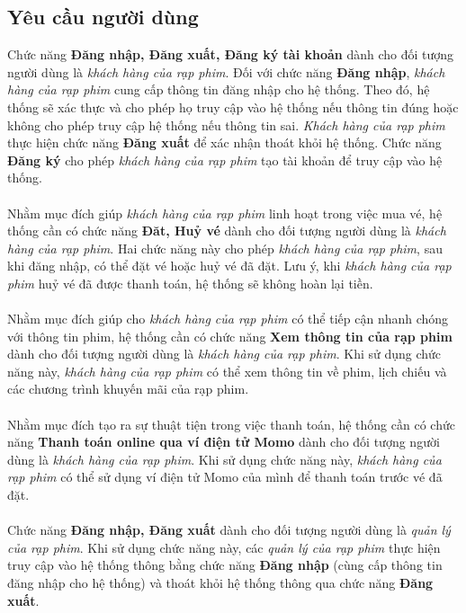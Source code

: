 \documentclass[a4paper, 12pt]{article}
\begin{document}
    \subsection{Yêu cầu người dùng}
    Chức năng \textbf{Đăng nhập, Đăng xuất, Đăng ký tài khoản} dành cho đối tượng người dùng là \textit{khách hàng của rạp phim}. Đối với chức năng \textbf{Đăng nhập}, \textit{khách hàng của rạp phim} cung cấp thông tin đăng nhập cho hệ thống. Theo đó, hệ thống sẽ xác thực và cho phép họ truy cập vào hệ thống nếu thông tin đúng hoặc không cho phép truy cập hệ thống nếu thông tin sai.
    \textit{Khách hàng của rạp phim} thực hiện chức năng \textbf{Đăng xuất} để xác nhận thoát khỏi hệ thống. Chức năng \textbf{Đăng ký} cho phép \textit{khách hàng của rạp phim} tạo tài khoản để truy cập vào hệ thống.
    \\\\
    Nhằm mục đích giúp \textit{khách hàng của rạp phim} linh hoạt trong việc mua vé, hệ thống cần có chức năng \textbf{Đăt, Huỷ vé} dành cho đối tượng người dùng là \textit{khách hàng của rạp phim}. Hai chức năng này cho phép \textit{khách hàng của rạp phim}, sau khi đăng nhập, có thể đặt vé hoặc huỷ vé đã đặt. Lưu ý, khi \textit{khách hàng của rạp phim} huỷ vé đã được thanh toán, hệ thống sẽ không hoàn lại tiền.
    \\\\
    Nhằm mục đích giúp cho \textit{khách hàng của rạp phim} có thể tiếp cận nhanh chóng với thông tin phim, hệ thống cần có chức năng \textbf{Xem thông tin của rạp phim} dành cho đối tượng người dùng là \textit{khách hàng của rạp phim}. Khi sử dụng chức năng này, \textit{khách hàng của rạp phim} có thể xem thông tin về phim, lịch chiếu và các chương trình khuyến mãi của rạp phim.
    \\\\
    Nhằm mục đích tạo ra sự thuật tiện trong việc thanh toán, hệ thống cần có chức năng \textbf{Thanh toán online qua ví điện tử Momo} dành cho đối tượng người dùng là \textit{khách hàng của rạp phim}. Khi sử dụng chức năng này, \textit{khách hàng của rạp phim} có thể sử dụng ví điện tử Momo của mình để thanh toán trước vé đã đặt.
    \\\\
    Chức năng \textbf{Đăng nhập, Đăng xuất} dành cho đối tượng người dùng là \textit{quản lý của rạp phim}. Khi sử dụng chức năng này, các \textit{quản lý của rạp phim} thực hiện truy cập vào hệ thống thông bằng chức năng \textbf{Đăng nhập} (cùng cấp thông tin đăng nhập cho hệ thống) và thoát khỏi hệ thống thông qua chức năng \textbf{Đăng xuất}.
\end{document}
